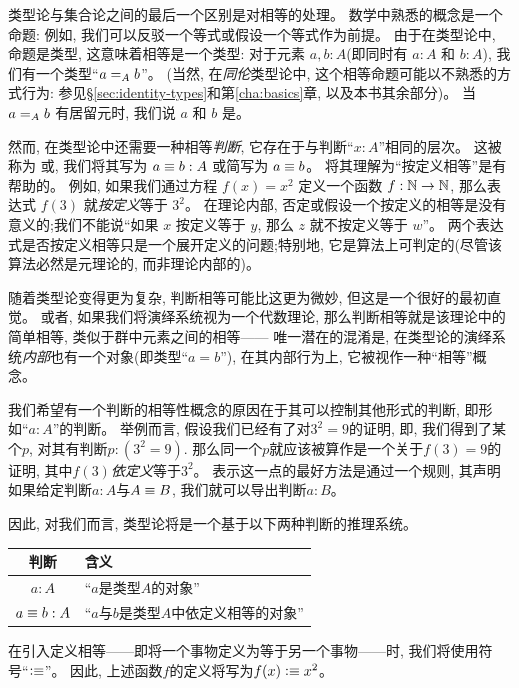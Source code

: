 类型论与集合论之间的最后一个区别是对相等的处理。
数学中熟悉的概念是一个命题: 例如, 我们可以反驳一个等式或假设一个等式作为前提。
由于在类型论中, 命题是类型, 这意味着相等是一个类型: 对于元素 $a,b:A$(即同时有 $a:A$ 和 $b:A$), 我们有一个类型``$\id[A]ab$''。
(当然, 在\emph{同伦}类型论中, 这个相等命题可能以不熟悉的方式行为: 参见\S\ref{sec:identity-types}和第\ref{cha:basics}章, 以及本书其余部分)。
当 $\id[A]ab$ 有居留元时, 我们说 $a$ 和 $b$ 是。
%
%

然而, 在类型论中还需要一种相等\emph{判断}, 它存在于与判断``$x:A$''相同的层次。
%
这被称为
%
%
或,
%
%
我们将其写为 $a\jdeq b : A$ 或简写为 $a \jdeq b$。
将其理解为``按定义相等''是有帮助的。
例如, 如果我们通过方程 $f(x)=x^2$ 定义一个函数 $f:\nat\to\nat$, 那么表达式 $f(3)$ 就\emph{按定义}等于 $3^2$。
在理论内部, 否定或假设一个按定义的相等是没有意义的;我们不能说``如果 $x$ 按定义等于 $y$, 那么 $z$ 就不按定义等于 $w$''。
两个表达式是否按定义相等只是一个展开定义的问题;特别地, 
它是算法上可判定的(尽管该算法必然是元理论的, 而非理论内部的)。

随着类型论变得更为复杂, 判断相等可能比这更为微妙, 但这是一个很好的最初直觉。
或者, 如果我们将演绎系统视为一个代数理论, 那么判断相等就是该理论中的简单相等, 类似于群中元素之间的相等——
唯一潜在的混淆是, 在类型论的演绎系统\emph{内部}也有一个对象(即类型``$a=b$''), 
在其内部行为上, 它被视作一种``相等''概念。

我们希望有一个判断的相等性概念的原因在于其可以控制其他形式的判断, 即形如``$a:A$''的判断。
举例而言, 假设我们已经有了对$3^2=9$的证明, 即, 我们得到了某个$p$, 对其有判断$p : (3^2 = 9)$.
那么同一个$p$就应该被算作是一个关于$f(3) = 9$的证明, 其中$f(3)$\emph{依定义}等于$3^2$。
表示这一点的最好方法是通过一个规则, 其声明如果给定判断$a:A$与$A \jdeq B$, 我们就可以导出判断$a : B$。

因此, 对我们而言, 类型论将是一个基于以下两种判断的推理系统。

\begin{center}
\medskip
\begin{tabular}{cl}
  \toprule
  判断 & 含义\\
  \midrule
  $a : A$       & ``$a$是类型$A$的对象''\\
  $a \jdeq b : A$ & ``$a$与$b$是类型$A$中依定义相等的对象''\\
  \bottomrule
\end{tabular}
\medskip
\end{center}
%
%
在引入定义相等——即将一个事物定义为等于另一个事物——时, 我们将使用符号``$\defeq$''。
因此, 上述函数$f$的定义将写为$f(x)\defeq x^2$。

